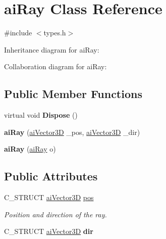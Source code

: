 \hypertarget{structai_ray}{\section{ai\+Ray Class Reference}
\label{structai_ray}
}


{\ttfamily \#include $<$types.\+h$>$}



Inheritance diagram for ai\+Ray\+:


Collaboration diagram for ai\+Ray\+:
\subsection*{Public Member Functions}
\begin{DoxyCompactItemize}
\item 
\hypertarget{structai_ray_a6c57873825d7d603ca1826bde3232d57}{virtual void {\bfseries Dispose} ()}\label{structai_ray_a6c57873825d7d603ca1826bde3232d57}

\item 
\hypertarget{structai_ray_a390213a2c905b7c5b0c1f1731cad9d87}{{\bfseries ai\+Ray} (\hyperlink{structai_vector3_d}{ai\+Vector3\+D} \+\_\+pos, \hyperlink{structai_vector3_d}{ai\+Vector3\+D} \+\_\+dir)}\label{structai_ray_a390213a2c905b7c5b0c1f1731cad9d87}

\item 
\hypertarget{structai_ray_ac805462db5ff6090773900e1b09e0cfe}{{\bfseries ai\+Ray} (\hyperlink{structai_ray}{ai\+Ray} o)}\label{structai_ray_ac805462db5ff6090773900e1b09e0cfe}

\end{DoxyCompactItemize}
\subsection*{Public Attributes}
\begin{DoxyCompactItemize}
\item 
\hypertarget{structai_ray_a312f663a7d2580b1b3beb52ffd4ab4c9}{C\+\_\+\+S\+T\+R\+U\+C\+T \hyperlink{structai_vector3_d}{ai\+Vector3\+D} \hyperlink{structai_ray_a312f663a7d2580b1b3beb52ffd4ab4c9}{pos}}\label{structai_ray_a312f663a7d2580b1b3beb52ffd4ab4c9}

\begin{DoxyCompactList}\small\item\em Position and direction of the ray. \end{DoxyCompactList}\item 
\hypertarget{structai_ray_a635d9120af2654716e5e7952d837282b}{C\+\_\+\+S\+T\+R\+U\+C\+T \hyperlink{structai_vector3_d}{ai\+Vector3\+D} {\bfseries dir}}\label{structai_ray_a635d9120af2654716e5e7952d837282b}

\end{DoxyCompactItemize}
